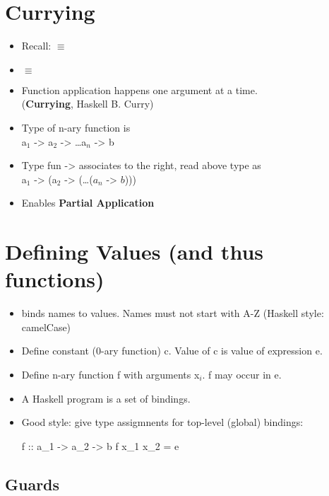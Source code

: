 \section{Currying}

\begin{itemize}
  \item Recall:  $\equiv$ 
  \item {} $\equiv$ 
  \item Function application happens one argument at a time. \\ (\textbf{Currying}, Haskell B. Curry)
  \item Type of n-ary function is \\ a$_1$ -> a$_2$ -> \dots a$_n$ -> b
  \item Type fun -> associates to the right, read above type as \\ a$_1$ -> (a$_2$ -> (\dots ($a_n$ -> $b$)))
  \item Enables \textbf{Partial Application}
\end{itemize}


\section{Defining Values (and thus functions)}

\begin{itemize}
  \item \codeline{=} binds names to values. Names must not start with A-Z (Haskell style: camelCase)
  \item Define constant (0-ary function) c. Value of c is value of expression e. \\ 
  \item Define n-ary function f with arguments x$_i$. f may occur in e. \\ 
  \item A Haskell program is a set of bindings.
  \item Good style: give type assigmnents for top-level (global) bindings: 
  \begin{codebox}[haskell]
f :: a_1 -> a_2 -> b
f x_1 x_2 = e
  \end{codebox}
\end{itemize}

\subsection{Guards}

